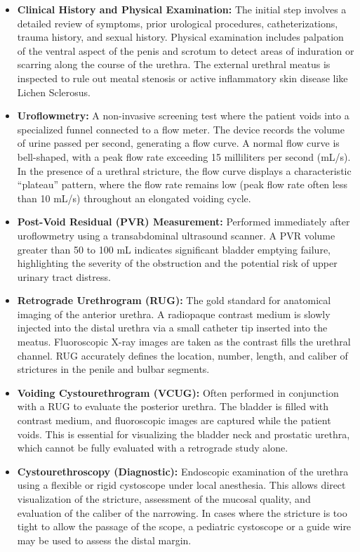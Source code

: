 \begin{itemize}
  \item \textbf{Clinical History and Physical Examination:} The initial step involves a detailed review of symptoms, prior urological procedures, catheterizations, trauma history, and sexual history. Physical examination includes palpation of the ventral aspect of the penis and scrotum to detect areas of induration or scarring along the course of the urethra. The external urethral meatus is inspected to rule out meatal stenosis or active inflammatory skin disease like Lichen Sclerosus.
  \item \textbf{Uroflowmetry:} A non-invasive screening test where the patient voids into a specialized funnel connected to a flow meter. The device records the volume of urine passed per second, generating a flow curve. A normal flow curve is bell-shaped, with a peak flow rate exceeding 15 milliliters per second (mL/s). In the presence of a urethral stricture, the flow curve displays a characteristic ``plateau'' pattern, where the flow rate remains low (peak flow rate often less than 10 mL/s) throughout an elongated voiding cycle.
  \item \textbf{Post-Void Residual (PVR) Measurement:} Performed immediately after uroflowmetry using a transabdominal ultrasound scanner. A PVR volume greater than 50 to 100 mL indicates significant bladder emptying failure, highlighting the severity of the obstruction and the potential risk of upper urinary tract distress.
  \item \textbf{Retrograde Urethrogram (RUG):} The gold standard for anatomical imaging of the anterior urethra. A radiopaque contrast medium is slowly injected into the distal urethra via a small catheter tip inserted into the meatus. Fluoroscopic X-ray images are taken as the contrast fills the urethral channel. RUG accurately defines the location, number, length, and caliber of strictures in the penile and bulbar segments.
  \item \textbf{Voiding Cystourethrogram (VCUG):} Often performed in conjunction with a RUG to evaluate the posterior urethra. The bladder is filled with contrast medium, and fluoroscopic images are captured while the patient voids. This is essential for visualizing the bladder neck and prostatic urethra, which cannot be fully evaluated with a retrograde study alone.
  \item \textbf{Cystourethroscopy (Diagnostic):} Endoscopic examination of the urethra using a flexible or rigid cystoscope under local anesthesia. This allows direct visualization of the stricture, assessment of the mucosal quality, and evaluation of the caliber of the narrowing. In cases where the stricture is too tight to allow the passage of the scope, a pediatric cystoscope or a guide wire may be used to assess the distal margin.

\end{itemize}
